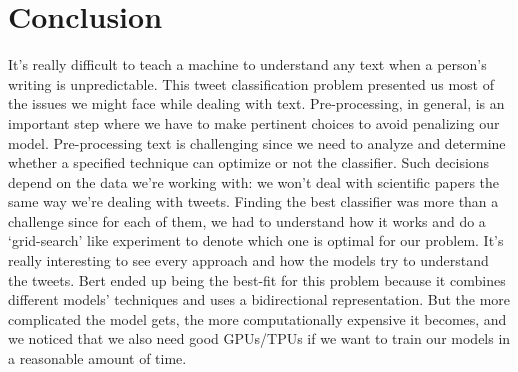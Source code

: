 \documentclass[letterpaper, 10 pt, conference]{ieeeconf}  %
\begin{document}
\section{Conclusion}
\label{sec:conclusion}
It’s really difficult to teach a machine to understand any text when a person’s writing is unpredictable. 
This tweet classification problem presented us most of the issues we might face while dealing with text. Pre-processing, in general, is an important step where we have to make pertinent choices to avoid penalizing our model. Pre-processing text is challenging since we need to analyze and determine whether a specified technique can optimize or not the classifier. Such decisions depend on the data we’re working with: we won’t deal with scientific papers the same way we’re dealing with tweets. 
Finding the best classifier was more than a challenge since for each of them, we had to understand how it works and do a ‘grid-search’ like experiment to denote which one is optimal for our problem. It’s really interesting to see every approach and how the models try to understand the tweets.
Bert ended up being the best-fit for this problem because it combines different models' techniques and uses a bidirectional representation. 
But the more complicated the model gets, the more computationally expensive it becomes, and we noticed that we also need good GPUs/TPUs if we want to train our models in a reasonable amount of time.

\addtolength{\textheight}{-12cm}   %














\end{document}
